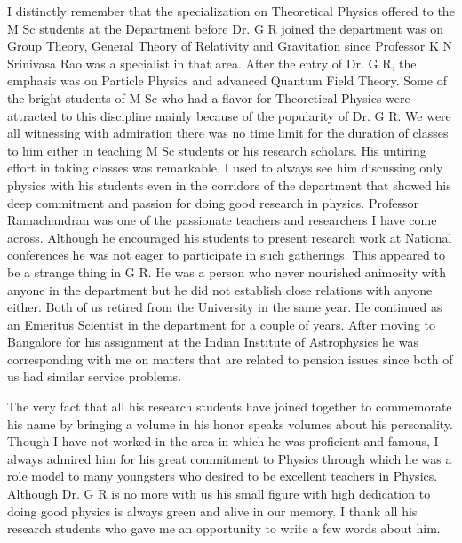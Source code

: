 I distinctly remember that the specialization on Theoretical Physics offered to the M Sc students at the Department before Dr. G R joined the department was on Group Theory, General Theory of Relativity and Gravitation since Professor K N Srinivasa Rao was a specialist in that area. After the entry of Dr. G R, the emphasis was on Particle Physics and advanced Quantum Field Theory. Some of the bright students of M Sc who had a flavor for Theoretical Physics were attracted to this discipline mainly because of the popularity of Dr. G R. We were all witnessing with admiration there was no time limit for the duration of classes to him either in teaching M Sc students or his research scholars. His untiring effort in taking classes was remarkable. I used to always see him discussing only physics with his students even in the corridors of the department that showed his deep commitment and passion for doing good research in physics.  Professor Ramachandran was one of the passionate teachers and researchers I have come across. Although he encouraged his students to present research work at National conferences he was not eager to participate in such gatherings. This appeared to be a strange thing in G R.  He was a person who never nourished animosity with anyone in the department but he did not establish close relations with anyone either. Both of us retired from the University in the same year. He continued as an Emeritus Scientist in the department for a couple of years. After moving to Bangalore for his assignment at the Indian Institute of Astrophysics he was corresponding with me on matters that are related to pension issues since both of us had similar service problems.

The very fact that all his research students have joined together to commemorate his name by bringing a volume in his honor speaks volumes about his personality. Though I have not worked in the area in which he was proficient and famous, I always admired him for his great commitment to Physics through which he was a role model to many youngsters who desired to be excellent teachers in Physics. Although Dr. G R is no more with us his small figure with high dedication to doing good physics is always green and alive in our memory. I thank all his research students who gave me an opportunity to write a few words about him.
